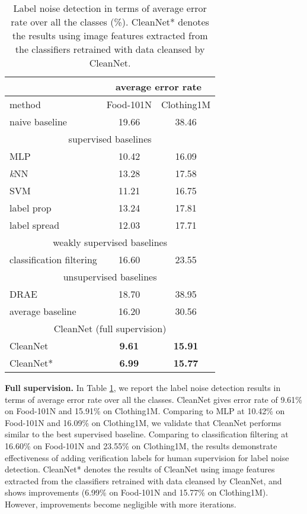 \documentclass[10pt,twocolumn,letterpaper]{article}
\begin{document}
\begin{table}[t]
\begin{center}
\small
\begin{tabular}{|l|c|c|}
\hline
& \multicolumn{2}{|c|}{average error rate} \\
\hline
method & Food-101N & Clothing1M \\
\hline\hline
naive baseline & 19.66 & 38.46\\
\hline
\multicolumn{3}{|c|}{supervised baselines} \\
\hline
MLP & 10.42  & 16.09\\
\textit{k}NN & 13.28  & 17.58 \\
SVM & 11.21  & 16.75\\
label prop \cite{zhu2002learning} & 13.24 & 17.81\\
label spread \cite{zhou2004learning} & 12.03  & 17.71\\
\hline
\multicolumn{3}{|c|}{weakly supervised baselines} \\
\hline
classification filtering & 16.60 & 23.55\\
\hline
\multicolumn{3}{|c|}{unsupervised baselines} \\
\hline
DRAE \cite{xia2015learning} & 18.70 & 38.95\\
average baseline & 16.20 & 30.56\\
\hline
\multicolumn{3}{|c|}{CleanNet (full supervision)} \\
\hline
CleanNet & \textbf{9.61} & \textbf{15.91}\\
CleanNet* & \textbf{6.99} & \textbf{15.77}\\
\hline
\end{tabular}
\end{center}
\caption{Label noise detection in terms of average error rate over all the classes (\%). CleanNet* denotes the results using image features extracted from the classifiers retrained with data cleansed by CleanNet.}
\label{tb:labelnoise}
\end{table}

\noindent
\textbf{Full supervision.} In Table \ref{tb:labelnoise}, we report the label noise detection results in terms of average error rate over all the classes. CleanNet gives error rate of 9.61\% on Food-101N and 15.91\% on Clothing1M. Comparing to MLP at 10.42\% on Food-101N and 16.09\% on Clothing1M, we validate that CleanNet performs similar to the best supervised baseline. Comparing to classification filtering at 16.60\% on Food-101N and 23.55\% on Clothing1M, the results demonstrate effectiveness of adding verification labels for human supervision for label noise detection. CleanNet* denotes the results of CleanNet using image features extracted from the classifiers retrained with data cleansed by CleanNet, and shows improvements (6.99\% on Food-101N and 15.77\% on Clothing1M). However, improvements become negligible with more iterations.
\end{document}
